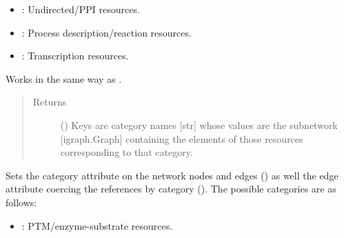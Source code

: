 \documentclass[letterpaper,10pt,english]{sphinxmanual}
\begin{document}
\begin{fulllineitems}
\begin{fulllineitems}
\begin{itemize}
\item {} 
: Undirected/PPI resources.

\item {} 
: Process description/reaction resources.

\item {} 
: Transcription resources.

\end{itemize}

Works in the same way as {\hyperref[\detokenize{main:pypath.main.PyPath.separate}]{}}.
\begin{quote}\begin{description}
\item[{Returns}] \leavevmode
() \textendash{} Keys are category names {[}str{]} whose values are
the subnetwork {[}igraph.Graph{]} containing the elements of
those resources corresponding to that category.

\end{description}\end{quote}

\end{fulllineitems}


\begin{fulllineitems}
\label{\detokenize{main:pypath.main.PyPath.sequences}}
\end{fulllineitems}


\begin{fulllineitems}
\label{\detokenize{main:pypath.main.PyPath.set_boolean_vattr}}
\end{fulllineitems}


\begin{fulllineitems}
\label{\detokenize{main:pypath.main.PyPath.set_categories}}
Sets the category attribute on the network nodes and edges
() as well the edge attribute coercing the references
by category (). The possible categories are
as follows:
\begin{itemize}
\item {} 
: PTM/enzyme-substrate resources.


\end{itemize}
\end{fulllineitems}
\end{fulllineitems}
\end{document}
